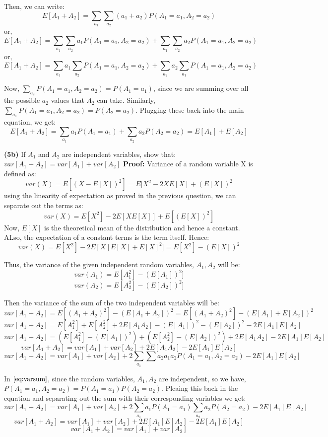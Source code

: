 \documentclass{article}
\renewcommand\part[1]{\vspace{.10in}\textbf{(#1)}}
\begin{document}
  Then, we can write:
  \[E[A_1 + A_2] = \sum_{a_1} \sum_{a_2} (a_1 + a_2)P(A_1 = a_1, A_2 = a_2)\]
  or,
  \[E[A_1 + A_2] = \sum_{a_1} \sum_{a_2} a_1 P(A_1 = a_1, A_2 = a_2) + \sum_{a_1} \sum_{a_2} a_2 P(A_1 = a_1, A_2 = a_2)\]
  or,
  \[E[A_1 + A_2] = \sum_{a_1} a_1 \sum_{a_2} P(A_1 = a_1, A_2 = a_2) + \sum_{a_2} a_2 \sum_{a_1} P(A_1 = a_1, A_2 = a_2)\]

  Now, $\sum_{a_2}P(A_1 = a_1, A_2 = a_2) = P(A_1 = a_1)$, since we are summing over all the possible $a_2$ values that $A_2$ can take. Similarly, $\sum_{a_1}P(A_1 = a_1, A_2 = a_2) = P(A_2 = a_2)$. Plugging these back into the main equation, we get:
  \[E[A_1 + A_2] = \sum_{a_1} a_1 P(A_1 = a_1) + \sum_{a_2} a_2 P(A_2 = a_2) = E[A_1] + E[A_2]\]


  \part{5b} If $A_1$ and $A_2$ are independent variables, show that: $var[A_1 + A_2] = var[A_1] + var[A_2]$ \newline
  \textbf {Proof:} Variance of a random variable X is defined as:
  \[var(X) = E[(X - E[X])^2] = E[X^2 - 2XE[X] + (E[X])^2\]
  using the linearity of expectation as proved in the previous question, we can separate out the terms as:
  \[var(X) = E[X^2] - 2E[XE[X]] + E[(E[X])^2]\]
  Now, $E[X]$ is the theoretical mean of the distribution and hence a constant. ALso, the expectation of a constant terms is the term itself. Hence:
  \[var(X) = E[X^2] - 2E[X]E[X] + E[X]^2] = E[X^2] - (E[X])^2\]

  Thus, the variance of the given independent random variables, $A_1,A_2$ will be:
  \[var(A_1) = E[A_1^2] - (E[A_1])^2]\]
  \[var(A_2) = E[A_2^2] - (E[A_2])^2]\]

  Then the variance of the sum of the two independent variables will be:
  \[var[A_1 + A_2] = E[(A_1 + A_2)^2] - (E[A_1 + A_2])^2 = E[(A_1 + A_2)^2] - (E[A_1] + E[A_2])^2\]
  \[var[A_1 + A_2] = E[A_1^2] + E[A_2^2] +2E[A_1A_2] - (E[A_1])^2 - (E[A_2])^2 - 2E[A_1]E[A_2]\]
  \[var[A_1 + A_2] = (E[A_1^2] - (E[A_1])^2) + (E[A_2^2] - (E[A_2])^2) + 2E[A_1A_2] - 2E[A_1]E[A_2]\]
  \[var[A_1 + A_2] = var[A_1] + var[A_2] + 2E[A_1A_2] - 2E[A_1]E[A_2] \]
  \begin{equation}
  var[A_1 + A_2] = var[A_1] + var[A_2] + 2\sum_{a_1}\sum{a_2}a_1a_2P(A_1 = a_1,A_2 = a_2) - 2E[A_1]E[A_2]
	  \label{eq:varsum}
  \end{equation}

  In $\eqref{eq:varsum}$, since the random variables, $A_1,A_2$ are independent, so we have, $P(A_1=a_1, A_2=a_2) = P(A_1=a_1)P(A_2=a_2)$. Plcaing this back in the equation and separating out the sum with their corresponding variables we get: 
  \[var[A_1 + A_2] = var[A_1] + var[A_2] + 2\sum_{a_1}a_1P(A_1=a_1)\sum_{a_2}a_2P(A_2 = a_2) - 2E[A_1]E[A_2]\]
  \[var[A_1 + A_2] = var[A_1] + var[A_2] + 2E[A_1]E[A_2] - 2E[A_1]E[A_2]\]
  \[var[A_1 + A_2] = var[A_1] + var[A_2] \]
\end{document}
